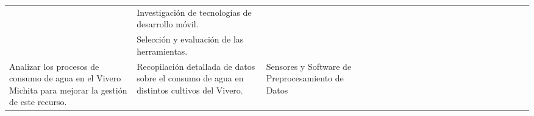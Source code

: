 \begin{landscape}
\begin{ThreePartTable}
\begin{longtable}{|p{}|p{5.5cm}|p{5.5cm}|l|l|l|l|l|l|l|l|l|l|l|l|l|l|l|l|l|l|l|}
      \cline{2-2}\cline{4-21}
                                                                                                                                                                                               & Investigación de tecnologías de desarrollo móvil.                                          &                                                                                                                  &                                       & \cellcolor{magenta!70}                &                                      &                                       &                        &                        &                        &                        &                        &                        &                        &                        &                        &                        &                        \\
      \cline{2-2}\cline{4-21}
                                                                                                                                                                                               & Selección y evaluación de las herramientas.                                                &                                                                                                                  &                                       & \cellcolor{magenta!70}                &                                      &                                       &                        &                        &                        &                        &                        &                        &                        &                        &                        &                        &                        \\
      \hline
      \multirow{4}{0.28 \textwidth}{Analizar los procesos de consumo de agua en el Vivero Michita para mejorar la gestión de este recurso.}                                                    & Recopilación detallada de datos sobre el consumo de agua en distintos cultivos del Vivero. & Sensores y Software de Preprocesamiento de Datos                                                                 &                                       &                                       & \cellcolor{magenta!70}               &                                       &                        &                        &                        &                        &                        &                        &                        &                        &                        &                        &                        \\

\end{longtable}
\end{ThreePartTable}
\end{landscape}
